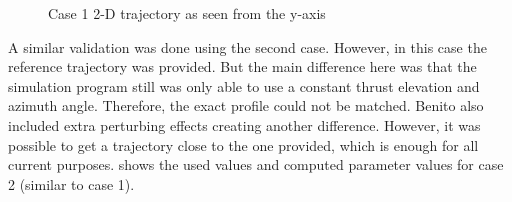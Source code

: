 


\begin{figure}[H]
\centering
\caption{Case 1 2-D trajectory as seen from the y-axis}
\label{fig:PlotFigure1SeenFromZoomYaxis}
\end{figure}




A similar validation was done using the second case. However, in this case the reference trajectory was provided. But the main difference here was that the simulation program still was only able to use a constant thrust elevation and azimuth angle. Therefore, the exact profile could not be matched. Benito also included extra perturbing effects creating another difference. However, it was possible to get a trajectory close to the one provided, which is enough for all current purposes.  shows the used values and computed parameter values for case 2 (similar to case 1).  





